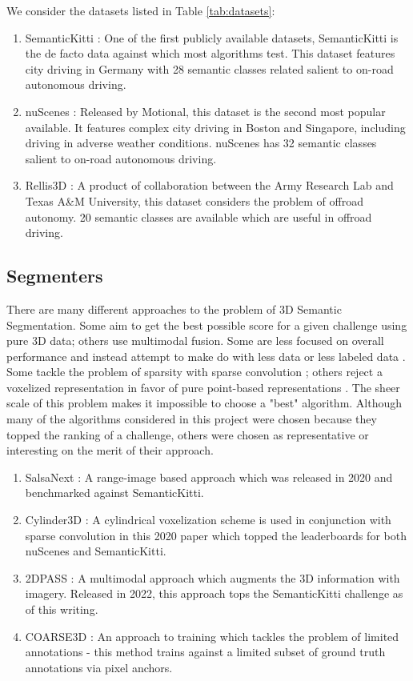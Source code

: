 We consider the datasets listed in Table \ref{tab:datasets}:
\begin{enumerate}
  \item SemanticKitti \cite{semantickitti}: One of the first publicly available datasets, SemanticKitti is the de facto data against which most algorithms test. This dataset features city driving in Germany with 28 semantic classes related salient to on-road autonomous driving.
  \item nuScenes \cite{nuscenes}: Released by Motional, this dataset is the second most popular available. It features complex city driving in Boston and Singapore, including driving in adverse weather conditions. nuScenes has 32 semantic classes salient to on-road autonomous driving.
  \item Rellis3D \cite{rellis3d}: A product of collaboration between the Army Research Lab and Texas A\&M University, this dataset considers the problem of offroad autonomy. 20 semantic classes are available which are useful in offroad driving.
\end{enumerate}

\subsection{Segmenters}
\label{chap:segmenters}

There are many different approaches to the problem of 3D Semantic Segmentation. Some aim to get the best possible score for a given challenge using pure 3D data; others use multimodal fusion. Some are less focused on overall performance and instead attempt to make do with less data or less labeled data \cite{2dpass}. Some tackle the problem of sparsity with sparse convolution \cite{SPARSECONV}; others reject a voxelized representation in favor of pure point-based representations \cite{pointnet}. The sheer scale of this problem makes it impossible to choose a "best" algorithm. Although many of the algorithms considered in this project were chosen because they topped the ranking of a challenge, others were chosen as representative or interesting on the merit of their approach.

\begin{enumerate}
  \item SalsaNext \cite{salsanext}: A range-image based approach which was released in 2020 and benchmarked against SemanticKitti.
  \item Cylinder3D \cite{cylinder3d}: A cylindrical voxelization scheme is used in conjunction with sparse convolution in this 2020 paper which topped the leaderboards for both nuScenes and SemanticKitti.
  \item 2DPASS \cite{2dpass}: A multimodal approach which augments the 3D information with imagery. Released in 2022, this approach tops the SemanticKitti challenge as of this writing.
  \item COARSE3D \cite{coarse3d}: An approach to training which tackles the problem of limited annotations - this method trains against a limited subset of ground truth annotations via pixel anchors.
\end{enumerate}


